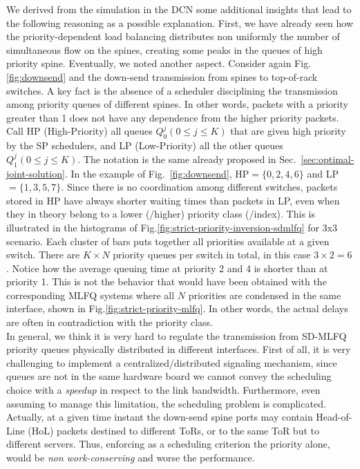We derived from the simulation in the DCN some additional insights that lead to the following reasoning as a possible explanation. First, we have already seen how the priority-dependent load balancing distributes non uniformly the number of simultaneous flow on the spines, creating some peaks in the queues of high priority spine. Eventually, we noted another aspect. Consider again Fig.\ref{fig:downsend} and the down-send transmission from spines to top-of-rack switches. A key fact is the absence of a scheduler disciplining the transmission among priority queues of different spines. In other words, packets with a priority greater than 1 does not have any dependence from the higher priority packets. Call HP (High-Priority) all queues $Q_0^j(0 \leq j \le K)$ that are given high priority by the SP schedulers, and LP (Low-Priority) all the other queues $Q_1^j(0 \leq j \le K)$. The notation is the same already proposed in Sec.~\ref{sec:optimal-joint-solution}. In the example of Fig.~\ref{fig:downsend}, HP$ = \{0,2,4,6\}$ and LP $ = \{1,3,5,7\}$.
Since there is no coordination among different switches, packets stored in HP have always shorter waiting times than packets in LP, even when they in theory belong to a lower (/higher) priority class (/index). This is illustrated in the histograms of Fig.\ref{fig:strict-priority-inversion-sdmlfq} for 3x3 scenario. Each cluster of bars puts together all priorities available at a given switch. There are $K \times N$ priority queues per switch in total, in this case $3 \times 2 = 6$. Notice how the average queuing time at priority 2 and 4 is shorter than at priority 1. This is not the behavior that would have been obtained with the corresponding MLFQ systems where all $N$ priorities are condensed in the same interface, shown in Fig.\ref{fig:strict-priority-mlfq}. In other words, the actual delays are often in contradiction with the priority class. \\
In general, we think it is very hard to regulate the transmission from SD-MLFQ priority queues physically distributed in different interfaces. First of all, it is very challenging to implement a centralized/distributed signaling mechanism, since queues are not in the same hardware board we cannot convey the scheduling choice with a \emph{speedup} in respect to the link bandwidth. Furthermore, even assuming to manage this limitation, the scheduling problem is complicated. Actually, at a given time instant the down-send spine ports may contain Head-of-Line (HoL) packets destined to different ToRs, or to the same ToR but to different servers. Thus, enforcing as a scheduling criterion the priority alone, would be \emph{non work-conserving} and worse the performance. 
